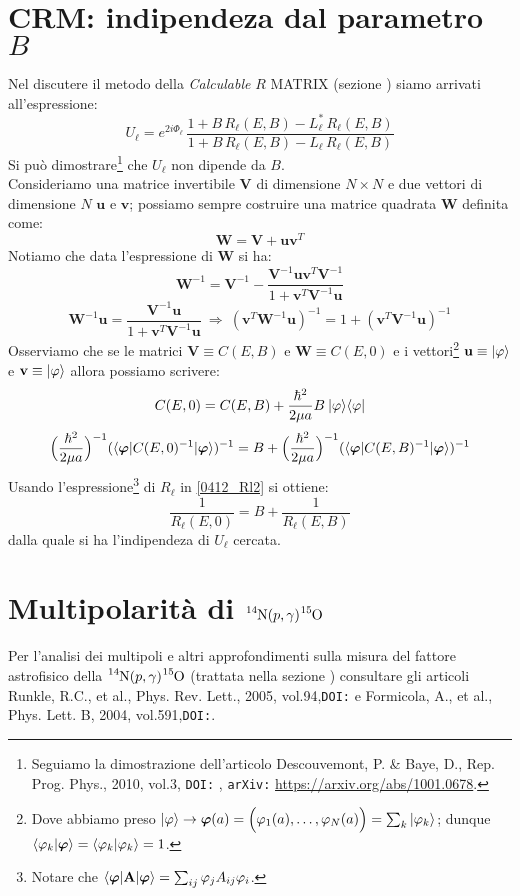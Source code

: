 \section{CRM: indipendeza dal parametro $B$}\label{compl-CRM-dim}
Nel discutere il metodo della \textit{Calculable} $R$ MATRIX (sezione ) siamo arrivati all'espressione:
$$U_\ell = e^{2i\Phi_\ell} \, \frac{1+B\,R_\ell (E,B)-L_\ell^* \, R_\ell (E,B)}{1+B\,R_\ell(E,B)-L_\ell  \, R_\ell (E,B)}$$
Si può dimostrare\footnote{Seguiamo la dimostrazione dell'articolo Descouvemont, P. \& Baye, D., Rep. Prog. Phys., 2010, vol.3, \texttt{DOI:} , \texttt{arXiv:} \url{https://arxiv.org/abs/1001.0678}.} che $U_\ell$ non dipende da $B$.\\
Consideriamo una matrice invertibile $\mathbf{V}$ di dimensione  $N\times N$ e due vettori di dimensione $N$ $\mathbf{u}$ e $\mathbf{v}$; possiamo sempre costruire una matrice quadrata $\mathbf{W}$ definita come:
$$\mathbf{W} = \mathbf{V} + \mathbf{u}\mathbf{v}^T$$
Notiamo che data l'espressione di $\mathbf{W}$ si ha:
$$\mathbf{W}^{-1} = \mathbf{V}^{-1} - \frac{\mathbf{V}^{-1}\mathbf{u}\mathbf{v}^T\mathbf{V}^{-1}}{1+\mathbf{v}^T\mathbf{V}^{-1}\mathbf{u}}$$
$$\mathbf{W}^{-1}\mathbf{u} = \frac{\mathbf{V}^{-1}\mathbf{u}}{1+\mathbf{v}^T\mathbf{V}^{-1}\mathbf{u}} \: \Rightarrow \: (\mathbf{v}^T\mathbf{W}^{-1}\mathbf{u})^{-1} = 1 + (\mathbf{v}^T\mathbf{V}^{-1}\mathbf{u})^{-1} $$
Osserviamo che se le matrici $\mathbf{V}\equiv C(E,B)$ e $\mathbf{W}\equiv C(E,0)$ e i vettori\footnote{Dove abbiamo preso $|\varphi\rangle \to \bm{\varphi}(a) = \Bigl ( \varphi_1 (a),\dots,\varphi_N(a) \Bigr ) = \sum_k |\varphi_k\rangle$; dunque $\langle \varphi_k | \bm{\varphi} \rangle=\langle \varphi_k | \varphi_k \rangle=1$.} $\mathbf{u} \equiv |\varphi\rangle$ e $\mathbf{v} \equiv |\varphi\rangle$ allora possiamo scrivere:
$$C(E,0) = C(E,B) + \frac{\hbar^2}{2\mu a} B\: |\varphi\rangle\langle\varphi|$$
$$\Bigl ( \frac{\hbar^2}{2\mu a} \Bigr )^{-1}(\langle\bm{\varphi}|C(E,0)^{-1}|\bm{\varphi}\rangle)^{-1} = B + \Bigl ( \frac{\hbar^2}{2\mu a} \Bigr )^{-1}(\langle\bm{\varphi}|C(E,B)^{-1}|\bm{\varphi}\rangle)^{-1} $$
Usando l'espressione\footnote{Notare che $\langle\bm{\varphi}|\mathbf{A}|\bm{\varphi}\rangle = \sum_{ij} \varphi_j A_{ij} \varphi_i$.} di $R_\ell$ in \eqref{0412_Rl2} si ottiene:
$$\frac{1}{R_\ell (E,0)} = B+ \frac{1}{R_\ell (E,B)}$$
dalla quale si ha l'indipendeza di $U_\ell$ cercata.

\section{Multipolarità di $\ce{^{14}N}(p,\gamma)\ce{^{15}O}$}\label{compl-multipoli}
Per l'analisi dei multipoli e altri approfondimenti sulla misura del fattore astrofisico della $\ce{^{14}N}(p,\gamma)\ce{^{15}O}$ (trattata nella sezione ) consultare gli articoli Runkle, R.C., et al., Phys. Rev. Lett., 2005, vol.94,\texttt{DOI:} e Formicola, A., et al., Phys. Lett. B, 2004, vol.591,\texttt{DOI:}.